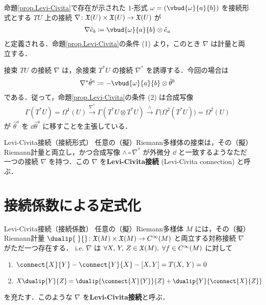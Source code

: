 \documentclass[geometry_main]{subfiles}
\begin{document}
命題\ref{prop.Levi-Civita}で存在が示された $1$-形式 $\omega = (\vbud{\omega}{a}{b})$ を接続形式とする $TU$ 上の接続 $\nabla \colon \mathfrak{X}(U) \times \mathfrak{X}(U) \to \mathfrak{X}(U)$ が
\begin{align} 
	\nabla \hat{e}_b \coloneqq \vbud{\omega}{a}{b} \otimes \hat{e}_a
\end{align}
と定義される．命題\ref{prop.Levi-Civita}の条件 (1) より，このとき $\nabla$ は計量と両立する．

接束 $TU$ の接続 $\nabla$ は，余接束 $T^*U$ の接続 $\nabla^*$ を誘導する．今回の場合は
\begin{align} 
	\nabla^* \hat{\theta}^a \coloneqq -\vbud{\omega}{a}{b} \otimes \hat{\theta}^b
\end{align}
である．従って，命題\ref{prop.Levi-Civita}の条件 (2) は合成写像
\begin{align} 
	\Gamma(T^*U) = \Omega^1(U) \xrightarrow{\nabla^*} \Gamma(T^*U \otimes T^*U) \xrightarrow{\wedge} \Gamma \bigl( \Omega^2(T^*U) \bigr) = \Omega^2(U)
\end{align}
が $\hat{\theta}^a$ を $\dd{\hat{\theta}^a}$ に移すことを主張している．

\begin{mytheo}[label=thm.Levi-Civita]{Levi-Civita接続（接続形式）}
	任意の（擬）Riemann多様体の接束は，その（擬）Riemann計量と両立し，かつ合成写像 $\wedge \circ \nabla^*$ が外微分 $\dd{}$ と一致するようなただ一つの接続 $\nabla$ を持つ．この $\nabla$ を\textbf{Levi-Civita接続} (Levi-Civita connection) と呼ぶ．
\end{mytheo}

\section{接続係数による定式化}

\begin{mytheo}[label=thm.Levi-Civita]{Levi-Civita接続（接続係数）}
	任意の（擬）Riemann多様体 $M$ には，その（擬）Riemann計量 $\dualip{\;}{} \colon \vecfield{M} \times \vecfield{M} \to \cinftyf{M}$ と両立する対称接続 $\nabla$ がただ一つ存在する．
	i.e. $\nabla$ は $\forall X,\, Y,\, Z \in \mathfrak{X}(M),\; \forall f \in C^\infty(M)$ に対して
	\begin{enumerate} 
		\item $\connect{X}{Y} - \connect{Y}{X} - \comm{X}{Y} = T(X,\, Y) = 0$
		\item $X \dualip{Y}{Z} = \dualip{\connect{X}{Y}}{Z} + \dualip{Y}{\connect{X}{Z}}$
	\end{enumerate}
	を充たす．このような $\nabla$ を\textbf{Levi-Civita接続}と呼ぶ．
\end{mytheo}
\end{document}
